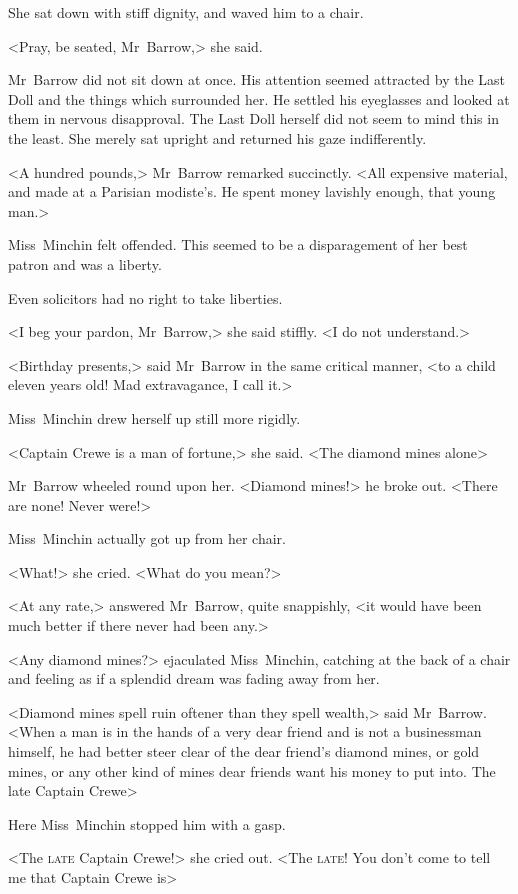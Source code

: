 She sat down with stiff dignity, and waved him to a chair.

<Pray, be seated, Mr~Barrow,> she said.

Mr~Barrow did not sit down at once. His attention seemed attracted by the Last Doll and the things which surrounded her. He settled his eyeglasses and looked at them in nervous disapproval. The Last Doll herself did not seem to mind this in the least. She merely sat upright and returned his gaze indifferently.

<A hundred pounds,> Mr~Barrow remarked succinctly. <All expensive material, and made at a Parisian modiste's. He spent money lavishly enough, that young man.>

Miss~Minchin felt offended. This seemed to be a disparagement of her best patron and was a liberty.

Even solicitors had no right to take liberties.

<I beg your pardon, Mr~Barrow,> she said stiffly. <I do not understand.>

<Birthday presents,> said Mr~Barrow in the same critical manner, <to a child eleven years old! Mad extravagance, I call it.>

Miss~Minchin drew herself up still more rigidly.

<Captain Crewe is a man of fortune,> she said. <The diamond mines alone\longdash>

Mr~Barrow wheeled round upon her. <Diamond mines!> he broke out. <There are none! Never were!>

Miss~Minchin actually got up from her chair.

<What!> she cried. <What do you mean?>

<At any rate,> answered Mr~Barrow, quite snappishly, <it would have been much better if there never had been any.>

<Any diamond mines?> ejaculated Miss~Minchin, catching at the back of a chair and feeling as if a splendid dream was fading away from her.

<Diamond mines spell ruin oftener than they spell wealth,> said Mr~Barrow. <When a man is in the hands of a very dear friend and is not a businessman himself, he had better steer clear of the dear friend's diamond mines, or gold mines, or any other kind of mines dear friends want his money to put into. The late Captain Crewe\longdash>

Here Miss~Minchin stopped him with a gasp.

<The \textsc{late} Captain Crewe!> she cried out. <The \textsc{late}! You don't come to tell me that Captain Crewe is\longdash>

